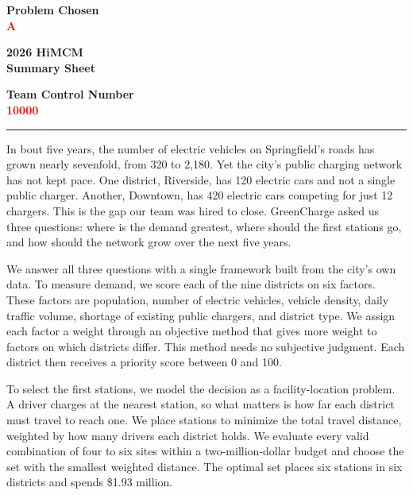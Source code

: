 \documentclass[12pt]{article}
\begin{document}
\thispagestyle{empty}

\vspace*{-20pt}
\noindent
\begin{minipage}[c]{0.32\textwidth}
\centering
\textbf{Problem Chosen}\\[3pt]
{\Large\textcolor{red}{\textbf{A}}}
\end{minipage}%
\begin{minipage}[c]{0.34\textwidth}
\centering
\textbf{2026 HiMCM}\\[3pt]
\textbf{Summary Sheet}
\end{minipage}%
\begin{minipage}[c]{0.34\textwidth}
\centering
\textbf{Team Control Number}\\[3pt]
{\Large\textcolor{red}{\textbf{10000}}}
\end{minipage}

\vspace{6pt}
\hrule
\vspace{12pt}

In bout five years, the number of electric vehicles on Springfield's roads has grown nearly
sevenfold, from 320 to 2,180. Yet the city's public charging network has not kept pace.
One district, Riverside, has 120 electric cars and not a single public charger. Another,
Downtown, has 420 electric cars competing for just 12 chargers. This is the gap our team
was hired to close. GreenCharge asked us three questions: where is the demand greatest,
where should the first stations go, and how should the network grow over the next five
years.

We answer all three questions with a single framework built from the city's own data. To
measure demand, we score each of the nine districts on six factors. These factors are
population, number of electric vehicles, vehicle density, daily traffic volume, shortage of
existing public chargers, and district type. We assign each factor a weight through an
objective method that gives more weight to factors on which districts differ. This method
needs no subjective judgment. Each district then receives a priority score between 0 and
100.

To select the first stations, we model the decision as a facility-location problem. A driver
charges at the nearest station, so what matters is how far each district must travel to reach
one. We place stations to minimize the total travel distance, weighted by how many
drivers each district holds. We evaluate every valid combination of four to six sites within
a two-million-dollar budget and choose the set with the smallest weighted distance. The
optimal set places six stations in six districts and spends \$1.93 million.
\end{document}

